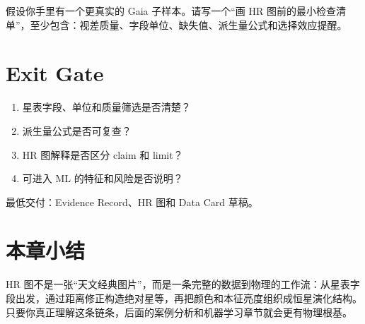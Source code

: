 \begin{exercisebox}[开放练习]
假设你手里有一个更真实的 Gaia 子样本。请写一个“画 HR 图前的最小检查清单”，至少包含：视差质量、字段单位、缺失值、派生量公式和选择效应提醒。
\end{exercisebox}

\section{Exit Gate}

\begin{enumerate}
    \item 星表字段、单位和质量筛选是否清楚？
    \item 派生量公式是否可复查？
    \item HR 图解释是否区分 claim 和 limit？
    \item 可进入 ML 的特征和风险是否说明？
\end{enumerate}

最低交付：Evidence Record、HR 图和 Data Card 草稿。

\section{本章小结}

HR 图不是一张“天文经典图片”，而是一条完整的数据到物理的工作流：从星表字段出发，通过距离修正构造绝对星等，再把颜色和本征亮度组织成恒星演化结构。只要你真正理解这条链条，后面的案例分析和机器学习章节就会更有物理根基。
